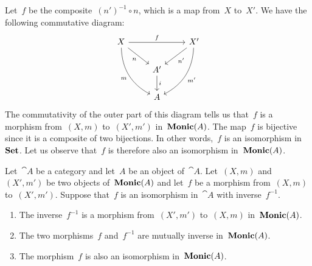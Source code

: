 Let~$f$ be the composite~$(n')^{-1} ∘ n$, which is a map from~$X$ to~$X'$.
We have the following commutative diagram:
\[
	\begin{tikzcd}[column sep = normal]
		X
		\arrow{rr}[above]{f}
		\arrow{dr}[below left]{n}
		\arrow[bend right]{ddr}[below left]{m}
		&
		{}
		&
		X'
		\arrow{dl}[below right]{n'}
		\arrow[bend left]{ddl}[below right]{m'}
		\\
		{}
		&
		A'
		\arrow{d}[right]{i}
		&
		{}
		\\
		{}
		&
		A
		&
		{}
	\end{tikzcd}
\]
The commutativity of the outer part of this diagram tells us that~$f$ is a morphism from~$(X, m)$ to~$(X', m')$ in~$\mathbf{Monic}(A)$.
The map~$f$ is bijective since it is a composite of two bijections.
In other words,~$f$ is an isomorphism in~$\mathbf{Set}$.
Let us observe that~$f$ is therefore also an isomorphism in~$\mathbf{Monic}(A)$.

\begin{proposition}
	\label{isomorphisms in mono categories}
	Let~$\cat{A}$ be a category and let~$A$ be an object of~$\cat{A}$.
	Let~$(X, m)$ and~$(X', m')$ be two objects of~$\mathbf{Monic}(A)$ and let~$f$ be a morphism from~$(X, m)$ to~$(X', m')$.
	Suppose that~$f$ is an isomorphism in~$\cat{A}$ with inverse~$f^{-1}$.
	\begin{enumerate}

		\item
			The inverse~$f^{-1}$ is a morphism from~$(X', m')$ to~$(X, m)$ in~$\mathbf{Monic}(A)$.

		\item
			\label{again mutually inverse in monic category}
			The two morphisms~$f$ and~$f^{-1}$ are mutually inverse in~$\mathbf{Monic}(A)$.

		\item
			The morphism~$f$ is also an isomorphism in~$\mathbf{Monic}(A)$.

	\end{enumerate}
\end{proposition}

